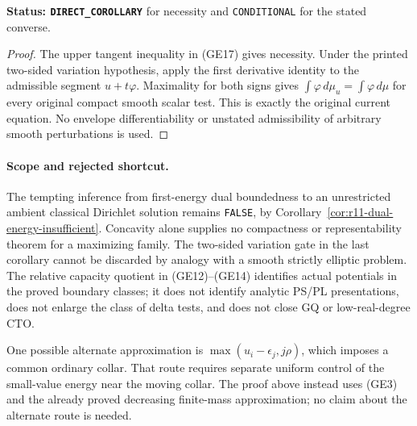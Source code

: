 \noindent\textbf{Status: \texttt{DIRECT\_COROLLARY}} for
necessity and \texttt{CONDITIONAL} for the stated converse.

\begin{proof}
The upper tangent inequality in (GE17) gives necessity.
Under the printed two-sided variation hypothesis, apply
the first derivative identity to the admissible segment
$u+t\varphi$. Maximality for both signs gives
$\int\varphi\,d\mu_u=\int\varphi\,d\mu$ for every
original compact smooth scalar test. This is exactly the
original current equation. No envelope differentiability or
unstated admissibility of arbitrary smooth perturbations is
used.
\end{proof}

\paragraph{Scope and rejected shortcut.}
The tempting inference from first-energy dual boundedness to
an unrestricted ambient classical Dirichlet solution remains
\texttt{FALSE}, by Corollary~\ref{cor:r11-dual-energy-insufficient}.
Concavity alone supplies no compactness or representability
theorem for a maximizing family. The two-sided variation gate
in the last corollary cannot be discarded by analogy with a
smooth strictly elliptic problem. The relative capacity quotient
in (GE12)--(GE14) identifies actual potentials in the proved
boundary classes; it does not identify analytic PS/PL
presentations, does not enlarge the class of delta tests, and
does not close GQ or low-real-degree CTO.

One possible alternate approximation is
$\max(u_i-\epsilon_j,j\rho)$, which imposes a common ordinary
collar. That route requires separate uniform control of the
small-value energy near the moving collar. The proof above
instead uses (GE3) and the already proved decreasing finite-mass
approximation; no claim about the alternate route is needed.
